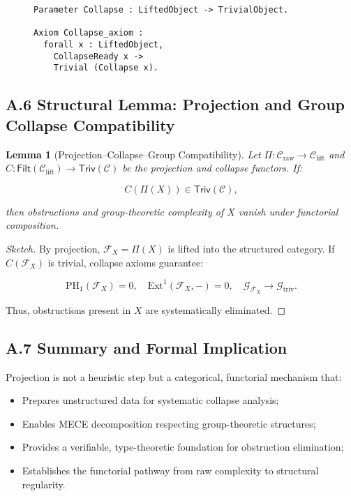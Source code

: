 \documentclass[11pt]{article}
\newtheorem{lemma}[theorem]{Lemma}
\begin{document}
\begin{figure}[h]
\centering
\begin{lstlisting}[language=Coq, caption=Collapse Functor Axiom]
Parameter Collapse : LiftedObject -> TrivialObject.

Axiom Collapse_axiom :
  forall x : LiftedObject,
    CollapseReady x ->
    Trivial (Collapse x).
\end{lstlisting}
\end{figure}

\subsection*{A.6 Structural Lemma: Projection and Group Collapse Compatibility}

\begin{lemma}[Projection–Collapse–Group Compatibility]
Let \( \Pi: \mathcal{C}_{\mathrm{raw}} \to \mathcal{C}_{\mathrm{lift}} \) and \( C: \mathsf{Filt}(\mathcal{C}_{\mathrm{lift}}) \to \mathsf{Triv}(\mathcal{C}) \) be the projection and collapse functors. If:

\[
C(\Pi(X)) \in \mathsf{Triv}(\mathcal{C}),
\]

then obstructions and group-theoretic complexity of \( X \) vanish under functorial composition.

\end{lemma}

\begin{proof}[Sketch]
By projection, \( \mathcal{F}_X = \Pi(X) \) is lifted into the structured category. If \( C(\mathcal{F}_X) \) is trivial, collapse axioms guarantee:

\[
\mathrm{PH}_1(\mathcal{F}_X) = 0, \quad \mathrm{Ext}^1(\mathcal{F}_X, -) = 0, \quad \mathcal{G}_{\mathcal{F}_X} \longrightarrow \mathcal{G}_{\mathrm{triv}}.
\]

Thus, obstructions present in \( X \) are systematically eliminated.
\end{proof}

\subsection*{A.7 Summary and Formal Implication}

Projection is not a heuristic step but a categorical, functorial mechanism that:

\begin{itemize}
    \item Prepares unstructured data for systematic collapse analysis;
    \item Enables MECE decomposition respecting group-theoretic structures;
    \item Provides a verifiable, type-theoretic foundation for obstruction elimination;
    \item Establishes the functorial pathway from raw complexity to structural regularity.
\end{itemize}
\end{document}
